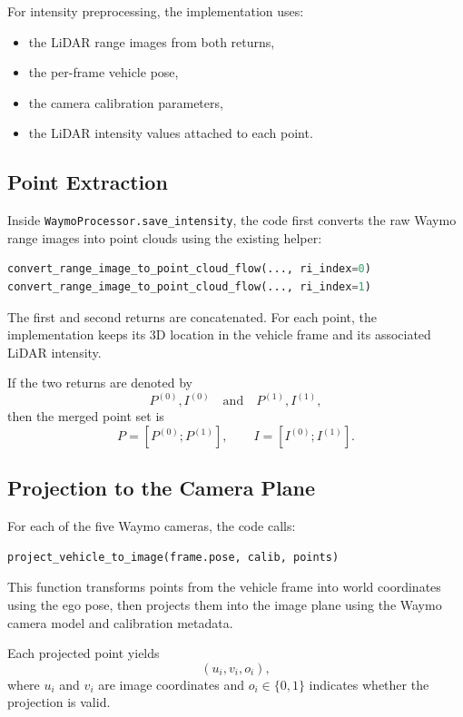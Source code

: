 \documentclass[11pt]{article}
\begin{document}
For intensity preprocessing, the implementation uses:

\begin{itemize}[leftmargin=1.5em]
    \item the LiDAR range images from both returns,
    \item the per-frame vehicle pose,
    \item the camera calibration parameters,
    \item the LiDAR intensity values attached to each point.
\end{itemize}

\subsection{Point Extraction}
Inside \texttt{WaymoProcessor.save\_intensity}, the code first converts the raw Waymo range images into point clouds using the existing helper:

\begin{lstlisting}[style=pystyle,language=Python]
convert_range_image_to_point_cloud_flow(..., ri_index=0)
convert_range_image_to_point_cloud_flow(..., ri_index=1)
\end{lstlisting}

The first and second returns are concatenated. For each point, the implementation keeps its 3D location in the vehicle frame and its associated LiDAR intensity.

If the two returns are denoted by
\[
P^{(0)}, I^{(0)} \quad \text{and} \quad P^{(1)}, I^{(1)},
\]
then the merged point set is
\[
P = \left[P^{(0)}; P^{(1)}\right],
\qquad
I = \left[I^{(0)}; I^{(1)}\right].
\]

\subsection{Projection to the Camera Plane}
For each of the five Waymo cameras, the code calls:

\begin{lstlisting}[style=pystyle,language=Python]
project_vehicle_to_image(frame.pose, calib, points)
\end{lstlisting}

This function transforms points from the vehicle frame into world coordinates using the ego pose, then projects them into the image plane using the Waymo camera model and calibration metadata.

Each projected point yields
\[
(u_i, v_i, o_i),
\]
where $u_i$ and $v_i$ are image coordinates and $o_i \in \{0,1\}$ indicates whether the projection is valid.
\end{document}
